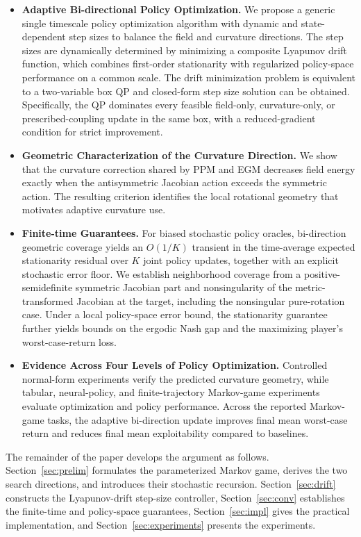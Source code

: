 \documentclass[journal]{IEEEtran}
\theoremstyle{remark}
\begin{document}
	\begin{itemize}[leftmargin=*,nosep]
		\item \textbf{Adaptive Bi-directional Policy Optimization.}
		We propose a generic single timescale policy optimization algorithm with dynamic and state-dependent step sizes to balance the field and curvature directions.
		The step sizes are dynamically determined by minimizing a composite Lyapunov drift function, which combines first-order stationarity with regularized policy-space performance on a common scale. The drift minimization problem is equivalent to a two-variable box QP and closed-form step size solution can be obtained.
		Specifically, the QP dominates every feasible field-only, curvature-only, or prescribed-coupling update in the same box, with a reduced-gradient condition for strict improvement.
		\item \textbf{Geometric Characterization of the Curvature Direction.}
		We show that the curvature correction shared by PPM and EGM decreases field energy exactly when the antisymmetric Jacobian action exceeds the symmetric action.
		The resulting criterion identifies the local rotational geometry that motivates adaptive curvature use.
		\item \textbf{Finite-time Guarantees.}
		For biased stochastic policy oracles, bi-direction geometric coverage yields an $O(1/K)$ transient in the time-average expected stationarity residual over $K$ joint policy updates, together with an explicit stochastic error floor.
		We establish neighborhood coverage from a positive-semidefinite symmetric Jacobian part and nonsingularity of the metric-transformed Jacobian at the target, including the nonsingular pure-rotation case.
		Under a local policy-space error bound, the stationarity guarantee further yields bounds on the ergodic Nash gap and the maximizing player's worst-case-return loss.
		\item \textbf{Evidence Across Four Levels of Policy Optimization.}
		Controlled normal-form experiments verify the predicted curvature geometry, while tabular, neural-policy, and finite-trajectory Markov-game experiments evaluate optimization and policy performance.
		Across the reported Markov-game tasks, the adaptive bi-direction update improves final mean worst-case return and reduces final mean exploitability compared to baselines.
	\end{itemize}
	
	The remainder of the paper develops the argument as follows.
	Section~\ref{sec:prelim} formulates the parameterized Markov game, derives the two search directions, and introduces their stochastic recursion.
	Section~\ref{sec:drift} constructs the Lyapunov-drift step-size controller, Section~\ref{sec:conv} establishes the finite-time and policy-space guarantees, Section~\ref{sec:impl} gives the practical implementation, and Section~\ref{sec:experiments} presents the experiments.
	
\end{document}
